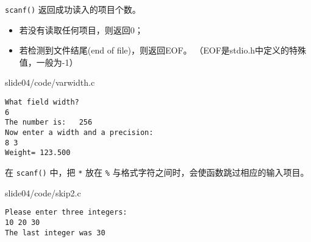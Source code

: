 \begin{frame}[fragile]
  \lstinline|scanf()| 返回成功读入的项目个数。

\begin{itemize}
\item
 若没有读取任何项目，则返回0；
\item
若检测到文件结尾(end of file)，则返回EOF。
（EOF是stdio.h中定义的特殊值，一般为-1）
\end{itemize}

\end{frame}

\begin{frame}
  
  {slide04/code/varwidth.c}

  \pause 
\begin{lstlisting}[showspaces=true,backgroundcolor=\color{red!20}]
What field width?
6
The number is:   256
Now enter a width and a precision:
8 3
Weight= 123.500
\end{lstlisting}
\end{frame}

\begin{frame}[fragile]
 在 \lstinline|scanf()| 中，把 \lstinline|*| 放在 \lstinline|%| 与格式字符之间时，会使函数跳过相应的输入项目。
\end{frame}

\begin{frame}[fragile]

  
  {slide04/code/skip2.c}

  \pause 
\begin{lstlisting}[showspaces=true,backgroundcolor=\color{red!10}]
Please enter three integers:
10 20 30
The last integer was 30
\end{lstlisting}
\end{frame}





